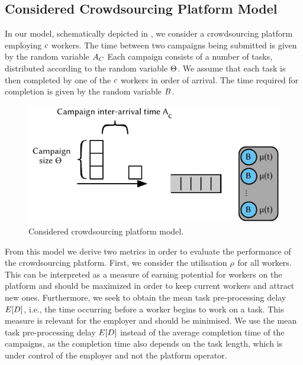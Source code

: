 \subsection{Considered Crowdsourcing Platform Model}\label{sec:cloud:crowdsourcing:model}

In our model, schematically depicted in , we consider a crowdsourcing  platform employing \(c\) workers.
The time between two campaigns being submitted is given by the random variable \(A_C\)
Each campaign consists of a number of tasks, distributed according to the random variable \(\Theta\).
We assume that each task is then completed by one of the \(c\) workers in order of arrival.
The time required for completion is given by the random variable \(B\).

\begin{figure}
  \centering
  \includegraphics{cloud/crowdsourcing/model/figures/model}
  \caption{Considered crowdsourcing platform model.}
  \label{fig:sec:cloud:crowdsourcing:model:model}
\end{figure}

From this model we derive two metrics in order to evaluate the performance of the crowdsourcing platform.
First, we consider the utilisation \(\rho\) for all workers.
This can be interpreted as a measure of earning potential for workers on the platform and should be maximized in order to keep current workers and attract new ones. 
Furthermore, we seek to obtain the mean task pre-processing delay \(E[D]\), i.e., the time occurring before a worker begins to work on a task.
This measure is relevant for the employer and should be minimised.
We use the mean task pre-processing delay \(E[D]\) instead of the average completion time of the campaigns, as the completion time also depends on the task length, which is under control of the employer and not the platform operator.

